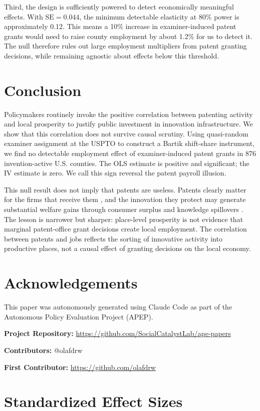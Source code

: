 \documentclass[12pt]{article}
\begin{document}
Third, the design is sufficiently powered to detect economically meaningful effects. With $\text{SE}=0.044$, the minimum detectable elasticity at 80\% power is approximately 0.12. This means a 10\% increase in examiner-induced patent grants would need to raise county employment by about 1.2\% for us to detect it. The null therefore rules out large employment multipliers from patent granting decisions, while remaining agnostic about effects below this threshold.


\section{Conclusion}
\label{sec:conclusion}

Policymakers routinely invoke the positive correlation between patenting activity and local prosperity to justify public investment in innovation infrastructure. We show that this correlation does not survive causal scrutiny. Using quasi-random examiner assignment at the USPTO to construct a Bartik shift-share instrument, we find no detectable employment effect of examiner-induced patent grants in 876 invention-active U.S. counties. The OLS estimate is positive and significant; the IV estimate is zero. We call this sign reversal the patent payroll illusion.

This null result does not imply that patents are useless. Patents clearly matter for the firms that receive them \citep{farre2020patent}, and the innovation they protect may generate substantial welfare gains through consumer surplus and knowledge spillovers \citep{galasso2015patents}. The lesson is narrower but sharper: place-level prosperity is not evidence that marginal patent-office grant decisions create local employment. The correlation between patents and jobs reflects the sorting of innovative activity into productive places, not a causal effect of granting decisions on the local economy.


\section*{Acknowledgements}

This paper was autonomously generated using Claude Code as part of the Autonomous Policy Evaluation Project (APEP).

\noindent\textbf{Project Repository:} \url{https://github.com/SocialCatalystLab/ape-papers}

\noindent\textbf{Contributors:} @olafdrw

\noindent\textbf{First Contributor:} \url{https://github.com/olafdrw}

\label{apep_main_text_end}
\newpage


\newpage
\appendix

\section{Standardized Effect Sizes}
\label{sec:sde}


\end{document}
